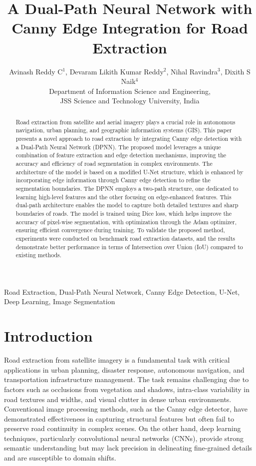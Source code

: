 \documentclass[conference]{IEEEtran}
\title{A Dual-Path Neural Network with Canny Edge Integration for Road Extraction}
\author{
    Avinash Reddy C$^{1}$, Devaram Likith Kumar Reddy$^{2}$, Nihal Ravindra$^{3}$, Dixith S Naik$^{4}$\\
    Department of Information Science and Engineering,\\
    JSS Science and Technology University, India\\
}
\begin{document}
\maketitle

\begin{abstract}
Road extraction from satellite and aerial imagery plays a crucial role in autonomous navigation, urban planning, and geographic information systems (GIS). This paper presents a novel approach to road extraction by integrating Canny edge detection with a Dual-Path Neural Network (DPNN). The proposed model leverages a unique combination of feature extraction and edge detection mechanisms, improving the accuracy and efficiency of road segmentation in complex environments. The architecture of the model is based on a modified U-Net structure, which is enhanced by incorporating edge information through Canny edge detection to refine the segmentation boundaries. The DPNN employs a two-path structure, one dedicated to learning high-level features and the other focusing on edge-enhanced features. This dual-path architecture enables the model to capture both detailed textures and sharp boundaries of roads. The model is trained using Dice loss, which helps improve the accuracy of pixel-wise segmentation, with optimization through the Adam optimizer, ensuring efficient convergence during training. To validate the proposed method, experiments were conducted on benchmark road extraction datasets, and the results demonstrate better performance in terms of Intersection over Union (IoU) compared to existing methods.
\end{abstract}

\begin{IEEEkeywords}
Road Extraction, Dual-Path Neural Network, Canny Edge Detection, U-Net, Deep Learning, Image Segmentation
\end{IEEEkeywords}

\section{Introduction}
Road extraction from satellite imagery is a fundamental task with critical applications in urban planning, disaster response, autonomous navigation, and transportation infrastructure management. The task remains challenging due to factors such as occlusions from vegetation and shadows, intra-class variability in road textures and widths, and visual clutter in dense urban environments. Conventional image processing methods, such as the Canny edge detector, have demonstrated effectiveness in capturing structural features but often fail to preserve road continuity in complex scenes. On the other hand, deep learning techniques, particularly convolutional neural networks (CNNs), provide strong semantic understanding but may lack precision in delineating fine-grained details and are susceptible to domain shifts.
\end{document}
